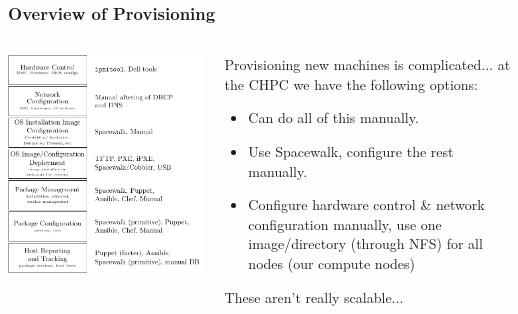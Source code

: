 \documentclass{beamer}
\begin{document}
\begin{frame}[fragile]
 \frametitle{Overview of Provisioning}
 \begin{columns}
  \begin{column}{0.5\textwidth}
   \includegraphics[width=\textwidth,height=\textheight-15mm,keepaspectratio]{provisioning_diagram}
  \end{column}

  \begin{column}{0.5\textwidth}
   Provisioning new machines is complicated... at the CHPC we have the following options:
   \begin{itemize}
    \item Can do all of this manually.
    \item Use Spacewalk, configure the rest manually.
    \item Configure hardware control \& network configuration manually, use one image/directory (through NFS) for all nodes (our compute nodes)
   \end{itemize}
   These aren't really scalable...
  \end{column}
 \end{columns}
\end{frame}
\end{document}
